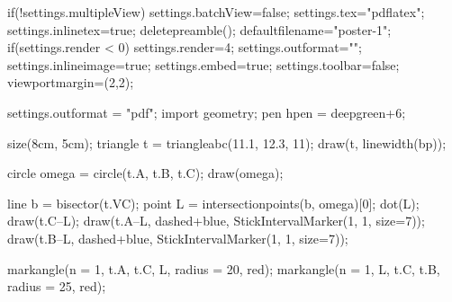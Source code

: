 if(!settings.multipleView) settings.batchView=false;
settings.tex="pdflatex";
settings.inlinetex=true;
deletepreamble();
defaultfilename="poster-1";
if(settings.render < 0) settings.render=4;
settings.outformat="";
settings.inlineimage=true;
settings.embed=true;
settings.toolbar=false;
viewportmargin=(2,2);

settings.outformat = "pdf";
import geometry;
pen hpen = deepgreen+6;

size(8cm, 5cm);
triangle t = triangleabc(11.1, 12.3, 11);
draw(t, linewidth(bp));

circle omega = circle(t.A, t.B, t.C); draw(omega);

line b = bisector(t.VC);
point L = intersectionpoints(b, omega)[0]; dot(L);
draw(t.C--L); draw(t.A--L, dashed+blue, StickIntervalMarker(1, 1, size=7)); draw(t.B--L, dashed+blue, StickIntervalMarker(1, 1, size=7));

markangle(n = 1, t.A, t.C, L, radius = 20, red);
markangle(n = 1, L, t.C, t.B, radius = 25, red);
